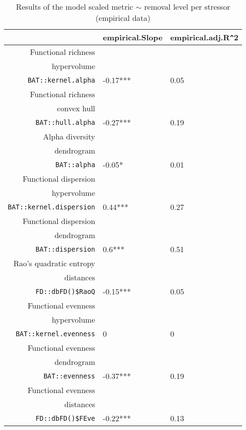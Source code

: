 \begin{table}[ht]
\centering
\begin{tabular}{rll}
  \hline
 & empirical.Slope & empirical.adj.R\verb|^|2 \\ 
  \hline
  Functional richness\\ hypervolume\\ \texttt{BAT::kernel.alpha} & -0.17*** & 0.05 \\ 
  Functional richness\\ convex hull\\ \texttt{BAT::hull.alpha} & -0.27*** & 0.19 \\ 
  Alpha diversity\\ dendrogram\\ \texttt{BAT::alpha} & -0.05* & 0.01 \\ 
  Functional dispersion\\ hypervolume\\ \texttt{BAT::kernel.dispersion} & 0.44*** & 0.27 \\ 
  Functional dispersion\\ dendrogram\\ \texttt{BAT::dispersion} & 0.6*** & 0.51 \\ 
  Rao's quadratic entropy\\ distances\\ \texttt{FD::dbFD()\$RaoQ} & -0.15*** & 0.05 \\ 
  Functional evenness\\ hypervolume\\ \texttt{BAT::kernel.evenness} & 0 & 0 \\ 
  Functional evenness\\ dendrogram\\ \texttt{BAT::evenness} & -0.37*** & 0.19 \\ 
  Functional evenness\\ distances\\ \texttt{FD::dbFD()\$FEve} & -0.22*** & 0.13 \\ 
   \hline
\end{tabular}
\caption{Results of the model scaled metric $\sim$ removal level per stressor (empirical data)} 
\end{table}
